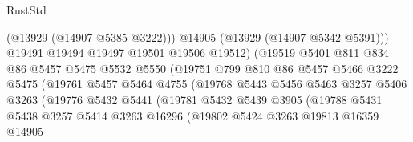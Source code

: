 \begin{lexlean}{RustStd}
\begin{coremodule}
                                      (@13929 (@14907 @5385 @3222)))
                                    @14905
                                    (@13929 (@14907 @5342 @5391)))
                                  @19491
                                  @19494
                                  @19497
                                  @19501
                                  @19506
                                  @19512)
                                (@19519
                                  @5401
                                  @811
                                  @834
                                  @86
                                  @5457
                                  @5475
                                  @5532
                                  @5550
                                  (@19751
                                    @799
                                    @810
                                    @86
                                    @5457
                                    @5466
                                    @3222
                                    @5475
                                    (@19761
                                      @5457
                                      @5464
                                      @4755
                                      (@19768
                                        @5443
                                        @5456
                                        @5463
                                        @3257
                                        @5406
                                        @3263
                                        (@19776
                                          @5432
                                          @5441
                                          (@19781
                                            @5432
                                            @5439
                                            @3905
                                            (@19788
                                              @5431
                                              @5438
                                              @3257
                                              @5414
                                              @3263
                                              @16296
                                              (@19802
                                                @5424
                                                @3263
                                                @19813
                                                @16359
                                                @14905

\end{coremodule}
\end{lexlean}

